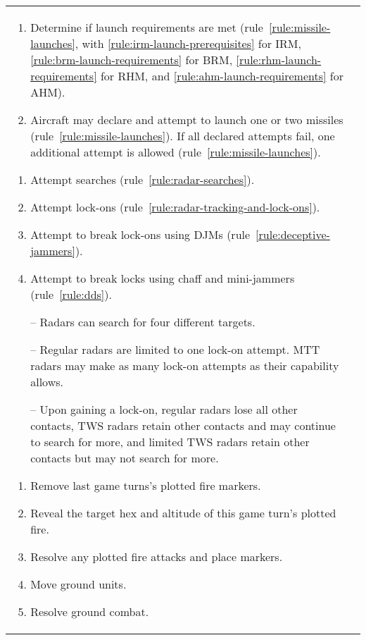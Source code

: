 \begin{twocolumntable}
\begin{tabularx}{1.0\linewidth}{L@{\hspace{\columnsep}}L}
{\begin{enumerate}[topsep=0pt,start=7]

\begin{enumerate}[nosep]
    \item Determine if launch requirements are met (rule~\ref{rule:missile-launches}, with \ref{rule:irm-launch-prerequisites} for IRM, \ref{rule:brm-launch-requirements} for BRM, \ref{rule:rhm-launch-requirements} for RHM, and \ref{rule:ahm-launch-requirements} for AHM).
    \item Aircraft may declare and attempt to launch one or two missiles (rule~\ref{rule:missile-launches}). If all declared attempts fail, one additional attempt is allowed (rule~\ref{rule:missile-launches}).
\end{enumerate}


\begin{enumerate}[nosep]
    \item Attempt searches (rule~\ref{rule:radar-searches}).
    \item Attempt lock-ons (rule~\ref{rule:radar-tracking-and-lock-ons}).
    \item Attempt to break lock-ons using DJMs (rule~\ref{rule:deceptive-jammers}).
    \item Attempt to break locks using chaff and mini-jammers (rule~\ref{rule:dds}).
    \item[--] Radars can search for four different targets.
    \item[--] Regular radars are limited to one lock-on attempt. MTT radars may make as many lock-on attempts as their capability allows.
    \item[--] Upon gaining a lock-on, regular radars lose all other contacts, TWS radars retain other contacts and may continue to search for more, and limited TWS radars retain other contacts but may not search for more.    
\end{enumerate}


\begin{enumerate}[nosep]
    \item Remove last game turns's plotted fire markers.
    \item Reveal the target hex and altitude of this game turn's plotted fire.
    \item Resolve any plotted fire attacks and place markers.
    \item Move ground units.
    \item Resolve ground combat.
\end{enumerate}


\end{enumerate}}
\end{tabularx}
\end{twocolumntable}
